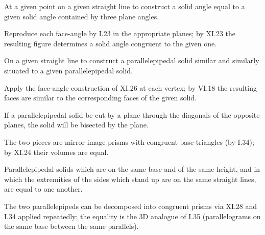 \begin{claim}
\label{prop:XI.26}
At a given point on a given straight line to construct a solid angle
equal to a given solid angle contained by three plane angles.
\end{claim}
\begin{evidence}[Proof of XI.26]
\label{ev:XI.26}
Reproduce each face-angle by I.23 in the appropriate planes; by XI.23
the resulting figure determines a solid angle congruent to the given
one.
\end{evidence}

\begin{claim}
\label{prop:XI.27}
On a given straight line to construct a parallelepipedal solid
similar and similarly situated to a given parallelepipedal solid.
\end{claim}
\begin{evidence}[Proof of XI.27]
\label{ev:XI.27}
Apply the face-angle construction of XI.26 at each vertex; by VI.18
the resulting faces are similar to the corresponding faces of the
given solid.
\end{evidence}

\begin{claim}
\label{prop:XI.28}
If a parallelepipedal solid be cut by a plane through the diagonals
of the opposite planes, the solid will be bisected by the plane.
\end{claim}
\begin{evidence}[Proof of XI.28]
\label{ev:XI.28}
The two pieces are mirror-image prisms with congruent base-triangles
(by I.34); by XI.24 their volumes are equal.
\end{evidence}

\begin{claim}
\label{prop:XI.29}
Parallelepipedal solids which are on the same base and of the same
height, and in which the extremities of the sides which stand up are
on the same straight lines, are equal to one another.
\end{claim}
\begin{evidence}[Proof of XI.29]
\label{ev:XI.29}
The two parallelepipeds can be decomposed into congruent prisms via
XI.28 and I.34 applied repeatedly; the equality is the 3D analogue
of I.35 (parallelograms on the same base between the same parallels).
\end{evidence}

